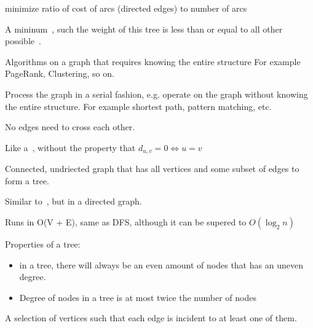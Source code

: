 \begin{definition}
    minimize ratio of cost of arcs (directed edges) to number of arcs
\end{definition}

\begin{definition}[MST]
    A mininum~, such the weight of this tree is less than
    or equal to all other possible~.
\end{definition}

\begin{definition}
    Algorithms on a graph that requires knowing the entire structure
    For example PageRank, Clustering, so on.
\end{definition}

\begin{definition}
    Process the graph in a serial fashion, e.g. operate on the graph without knowing
    the entire structure. For example shortest path, pattern matching, etc.
\end{definition}

\begin{definition}
    No edges need to cross each other.
\end{definition}

\begin{definition}\label{semimetric}
    Like a~, without the property that
    $d_{u,v} = 0 \iff u = v$
\end{definition}


\begin{definition}\label{spantree}
    Connected, undriected graph that has all vertices and some subset
    of edges to form a tree.
\end{definition}

\begin{definition}
    Similar to~, but in a directed graph.
\end{definition}

\begin{definition}\label{topsort}
    Runs in O(V + E), same as DFS, although it can be supered to $O(\log_{2} n)$
\end{definition}

\begin{definition}[Tree]\label{tree}
    Properties of a tree:
    \begin{itemize}
        \item in a tree, there will always be an even amount of nodes that has
            an uneven degree.
        \item Degree of nodes in a tree is at most twice the number of nodes
    \end{itemize}
\end{definition}



\begin{definition}
    A selection of vertices such that each edge is incident to at least one
    of them.
\end{definition}

